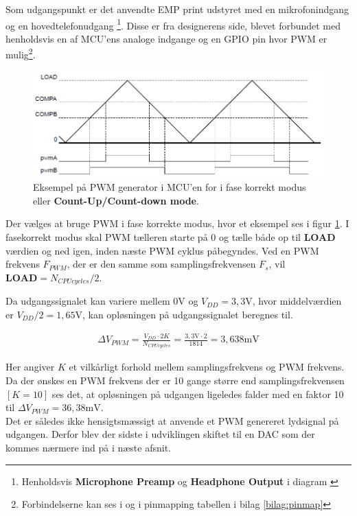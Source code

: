 Som udgangspunkt er det anvendte EMP print udstyret med en mikrofonindgang og en hovedtelefonudgang \footnote{Henholdsvis \textbf{Microphone Preamp} og \textbf{Headphone Output} i diagram \cite{emp-diagram}}. Disse er fra designerens side, blevet forbundet med henholdsvis en af MCU'ens analoge indgange og en GPIO pin hvor PWM er mulig\footnote{Forbindelserne kan ses i \cite{emp-diagram} og i pinmapping tabellen i bilag \ref{bilag:pinmap}}.

\begin{figure}[h!]
	\centering
	\includegraphics[width=.7\textwidth]{billeder/pwm.png}
	\caption{Eksempel på PWM generator i MCU'en for i fase korrekt modus eller \textbf{Count-Up/Count-down mode}\cite[Fig. 20-5 s. 1232]{tm4c123gh6pm}.}
	\label{fig:pwm}
\end{figure}

Der vælges at bruge PWM i fase korrekte modus, hvor et eksempel ses i figur \ref{fig:pwm}.
I fasekorrekt modus skal PWM tælleren starte på 0 og tælle både op til \textbf{LOAD} værdien og ned igen, inden næste PWM cyklus påbegyndes.
Ved en PWM frekvens $F_{PWM}$, der er den samme som samplingsfrekvensen $F_s$, vil $\textbf{LOAD} = N_{CPU cycles} / 2$.

Da udgangssignalet kan variere mellem $ 0 \si{\volt}$ og $V_{DD} = 3,3 \si{\volt}$, hvor middelværdien er $V_{DD}/2 = 1,65 \si{\volt}$, kan opløsningen på udgangssignalet beregnes til.

\begin{align}
\Delta V_{PWM} = \frac{V_{DD} \cdot 2K}{N_{CPU cycles}} = \frac{3,3\si{\volt} \cdot 2}{1814} =  3,638\si{\milli\volt}
\end{align}

Her angiver $K$ et vilkårligt forhold mellem samplingsfrekvens og PWM frekvens.\\

Da der ønskes en PWM frekvens der er 10 gange større end samplingsfrekvensen $[K=10]$ ses det, at opløsningen på udgangen ligeledes falder med en faktor 10 til $\Delta V_{PWM} = 36,38\si{\milli\volt}$.\\

Det er således ikke hensigtsmæssigt at anvende et PWM genereret lydsignal på udgangen.
Derfor blev der sidste i udviklingen skiftet til en DAC som der kommes nærmere ind på i næste afsnit.\\

